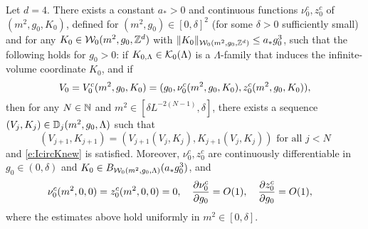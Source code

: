 \begin{theorem}
\label{thm:flow-flow}
Let $d = 4$.
There exists a constant $a_* > 0$ and continuous functions $\nu_0^c, z_0^c$
of $(m^2, g_0, K_0)$, defined for $(m^2, g_0) \in [0, \delta]^2$
(for some $\delta > 0$ sufficiently small) and for any $K_0 \in \mathcal{W}_0(m^2, g_0, { {{\mathbb Z}}^d })$
with $\|K_0\|_{\mathcal{W}_0(m^2, g_0, { {{\mathbb Z}}^d })} \leq a_* g_0^3$, such that
the following holds for $g_0 > 0$:
if $K_{0,\Lambda} \in \mathcal{K}_0(\Lambda)$ is a $\Lambda$-family
that induces the infinite-volume coordinate $K_0$, and if
\begin{equation}
\label{e:flow-flow-ic}
V_0 = V_0^c(m^2, g_0, K_0) = (g_0, \nu_0^c(m^2,g_0,K_0), z_0^c(m^2,g_0,K_0)),
\end{equation}
then for any $N \in {\mathbb N}$ and $m^2 \in [\delta L^{-2 (N - 1)}, \delta]$,
there exists a sequence $(V_j, K_j) \in \mathbb{D}_j(m^2, g_0, \Lambda)$
such that
\begin{equation}
  \label{e:VjKjDj}
  (V_{j+1},K_{j+1}) = (V_{j+1}(V_j, K_j), K_{j+1}(V_j, K_j)) \text{ for all } j < N
\end{equation}
and \eqref{e:IcircKnew} is satisfied.
Moreover, $\nu_0^c,z_0^c$ are continuously differentiable in
$g_0 \in (0, \delta)$ and $K_0 \in B_{\mathcal{W}_0(m^2, g_0, \Lambda)}(a_* g_0^3)$, and
\begin{align}
&\nu_0^c(m^2,0,0) = z_0^c(m^2,0,0) = 0,
\quad
\frac{\partial \nu_0^c}{\partial g_0} = O(1),
\quad
\label{e:z0est}
\frac{\partial z_0^c}{\partial g_0} = O(1),
\end{align}
where the estimates above hold uniformly in $m^2 \in [0, \delta]$.
\end{theorem}

